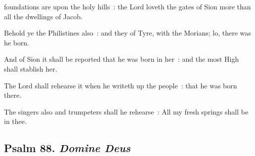  foundations are upon the holy hills~: the Lord loveth the gates of Sion more than all the dwellings of Jacob.\par
{}
Behold ye the Philistines also~: and they of Tyre, with the Morians; lo, there was he born.\par
{}And of Sion it shall be reported that he was born in her~: and the most High shall stablish her.\par
{}The Lord shall rehearse it when he writeth up the people~: that he was born there.\par
{}The singers also and trumpeters shall he rehearse~: All my fresh springs shall be in thee.\par

\subsection{Psalm 88. \textit{Domine Deus}}

